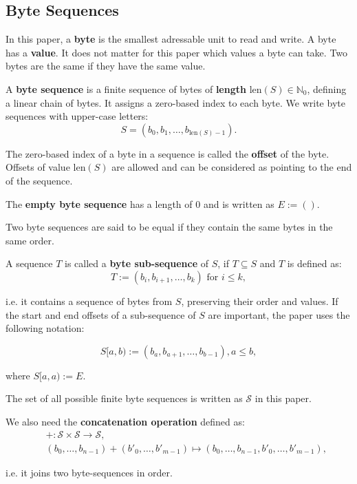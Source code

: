 \documentclass[english, 10pt, openright, twocolumn, landscape, twoside, notitlepage, a4paper, pdftex]		
{article}
\begin{document}
\subsection{Byte Sequences}%
\label{sec:ByteSequences}%

In this paper, a \textbf{byte} is the smallest adressable unit to read and write. A byte has a \textbf{value}. It does not matter for this paper which values a byte can take. Two bytes are the same if they have the same value.

A \textbf{byte sequence} is a finite sequence of bytes of \textbf{length} $\text{len}(S)\in\mathbb{N}_{0}$, defining a linear chain of bytes. It assigns a zero-based index to each byte. We write byte sequences with upper-case letters:
\[S=(b_{0}, b_{1}, \ldots, b_{\text{len}(S)-1}).\]

The zero-based index of a byte in a sequence is called the \textbf{offset} of the byte. Offsets of value $\text{len}(S)$ are allowed and can be considered as pointing to the end of the sequence.

The \textbf{empty byte sequence} has a length of 0 and is written as $E:=()$.

Two byte sequences are said to be equal if they contain the same bytes in the same order.

A sequence $T$ is called a \textbf{byte sub-sequence} of $S$, if $T\subseteq S$ and $T$ is defined as:
\[T:=(b_{i}, b_{i+1}, \ldots, b_{k})\text{ for }i\leq k,\]

i.e. it contains a sequence of bytes from $S$, preserving their order and values. If the start and end offsets of a sub-sequence of $S$ are important, the paper uses the following notation:

\[S[a, b):=(b_{a}, b_{a+1}, \ldots, b_{b-1}),a\leq b,\]

where $S[a, a):=E.$

The set of all possible finite byte sequences is written as $\mathcal{S}$ in this paper.

We also need the \textbf{concatenation operation} defined as:
\begin{eqnarray*}
  &&+:\mathcal{S}\times \mathcal{S} \rightarrow \mathcal{S}, \\
&&(b_{0},\ldots,b_{n-1})+(b'_{0},\ldots,b'_{m-1}) \mapsto (b_{0},\ldots,b_{n-1}, b'_{0},\ldots,b'_{m-1}),
\end{eqnarray*}

i.e. it joins two byte-sequences in order.

\end{document}

